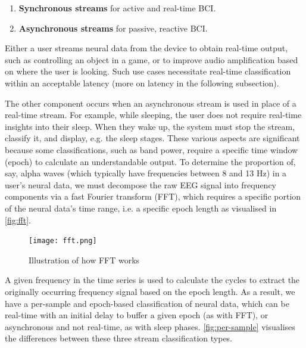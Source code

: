 \begin{enumerate}
  \item \textbf{Synchronous streams} for active and real-time BCI.
  \item \textbf{Asynchronous streams} for passive, reactive BCI.
\end{enumerate}

Either a user streams neural data from the device to obtain real-time output, such as controlling an object in a game, or to improve audio amplification based on where the user is looking. Such use cases necessitate real-time classification within an acceptable latency (more on latency in the following subsection).

The other component occurs when an asynchronous stream is used in place of a real-time stream. For example, while sleeping, the user does not require real-time insights into their sleep. When they wake up, the system must stop the stream, classify it, and display, e.g. the sleep stages. These various aspects are significant because some classifications, such as band power, require a specific time window (epoch) to calculate an understandable output. To determine the proportion of, say, alpha waves (which typically have frequencies between 8 and 13 Hz) in a user's neural data, we must decompose the raw EEG signal into frequency components via a fast Fourier transform (FFT), which requires a specific portion of the neural data's time range, i.e. a specific epoch length as visualised in \autoref{fig:fft}.

\begin{figure}[!ht]
  \centering
  \texttt{[image: fft.png]}
  \caption[Illustration of how FFT works]{Illustration of how FFT works \citep{3blue1brown_but_2018}}
  \label{fig:fft}
\end{figure}

A given frequency in the time series is used to calculate the cycles to extract the originally occurring frequency signal based on the epoch length. As a result, we have a per-sample and epoch-based classification of neural data, which can be real-time with an initial delay to buffer a given epoch (as with FFT), or asynchronous and not real-time, as with sleep phases. \autoref{fig:per-sample} visualises the differences between these three stream classification types.

